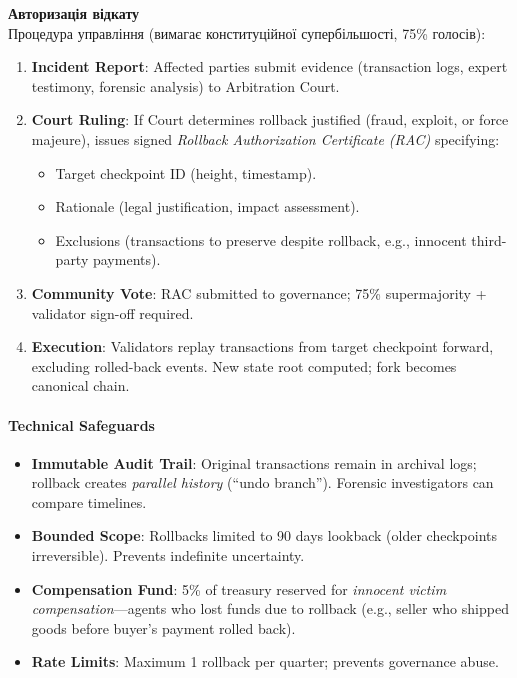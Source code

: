 \documentclass[11pt]{article}
\begin{document}
\textbf{Авторизація відкату}\\
Процедура управління (вимагає конституційної супербільшості, 75\% голосів):
\begin{enumerate}[noitemsep]
  \item \textbf{Incident Report}: Affected parties submit evidence (transaction logs, expert testimony, forensic analysis) to Arbitration Court.
  \item \textbf{Court Ruling}: If Court determines rollback justified (fraud, exploit, or force majeure), issues signed \emph{Rollback Authorization Certificate (RAC)} specifying:
    \begin{itemize}[noitemsep]
      \item Target checkpoint ID (height, timestamp).
      \item Rationale (legal justification, impact assessment).
      \item Exclusions (transactions to preserve despite rollback, e.g., innocent third-party payments).
    \end{itemize}
  \item \textbf{Community Vote}: RAC submitted to governance; 75\% supermajority + validator sign-off required.
  \item \textbf{Execution}: Validators replay transactions from target checkpoint forward, excluding rolled-back events. New state root computed; fork becomes canonical chain.
\end{enumerate}

\paragraph{Technical Safeguards}
\begin{itemize}[noitemsep]
  \item \textbf{Immutable Audit Trail}: Original transactions remain in archival logs; rollback creates \emph{parallel history} (``undo branch''). Forensic investigators can compare timelines.
  \item \textbf{Bounded Scope}: Rollbacks limited to 90 days lookback (older checkpoints irreversible). Prevents indefinite uncertainty.
  \item \textbf{Compensation Fund}: 5\% of treasury reserved for \emph{innocent victim compensation}—agents who lost funds due to rollback (e.g., seller who shipped goods before buyer's payment rolled back).
  \item \textbf{Rate Limits}: Maximum 1 rollback per quarter; prevents governance abuse.
\end{itemize}
\end{document}
